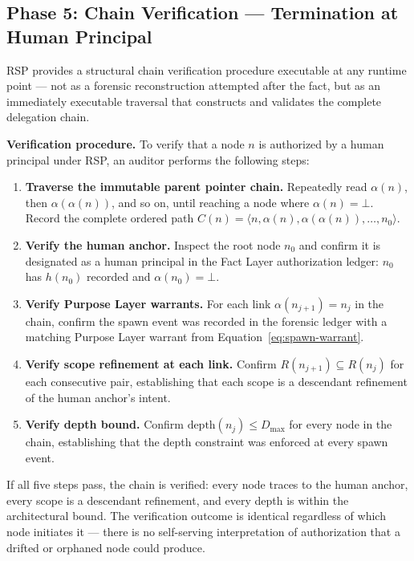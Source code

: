 \subsection{Phase 5: Chain Verification — Termination at Human Principal}
\label{sec:rs-verification}

RSP provides a structural chain verification procedure executable at any runtime point — not as a forensic reconstruction attempted after the fact, but as an immediately executable traversal that constructs and validates the complete delegation chain.

\medskip
\noindent\textbf{Verification procedure.} To verify that a node $n$ is authorized by a human principal under RSP, an auditor performs the following steps:

\begin{enumerate}
    \item[(V1)] \textbf{Traverse the immutable parent pointer chain.} Repeatedly read $\alpha(n)$, then $\alpha(\alpha(n))$, and so on, until reaching a node where $\alpha(n) = \bot$. Record the complete ordered path $C(n) = \langle n, \alpha(n), \alpha(\alpha(n)), \ldots, n_0 \rangle$.

    \item[(V2)] \textbf{Verify the human anchor.} Inspect the root node $n_0$ and confirm it is designated as a human principal in the Fact Layer authorization ledger: $n_0$ has $h(n_0)$ recorded and $\alpha(n_0) = \bot$.

    \item[(V3)] \textbf{Verify Purpose Layer warrants.} For each link $\alpha(n_{j+1}) = n_j$ in the chain, confirm the spawn event was recorded in the forensic ledger with a matching Purpose Layer warrant from Equation~\ref{eq:spawn-warrant}.

    \item[(V4)] \textbf{Verify scope refinement at each link.} Confirm $R(n_{j+1}) \subseteq R(n_j)$ for each consecutive pair, establishing that each scope is a descendant refinement of the human anchor's intent.

    \item[(V5)] \textbf{Verify depth bound.} Confirm $\text{depth}(n_j) \leq D_{\max}$ for every node in the chain, establishing that the depth constraint was enforced at every spawn event.
\end{enumerate}

If all five steps pass, the chain is verified: every node traces to the human anchor, every scope is a descendant refinement, and every depth is within the architectural bound. The verification outcome is identical regardless of which node initiates it — there is no self-serving interpretation of authorization that a drifted or orphaned node could produce.

